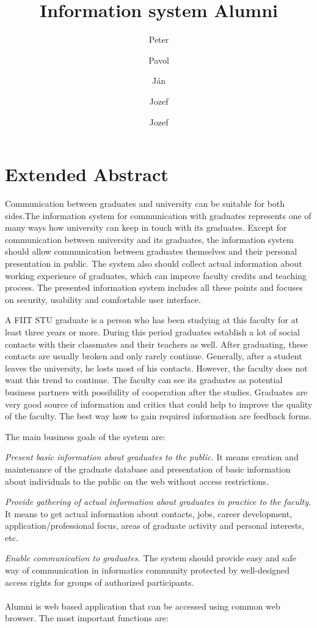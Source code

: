 \documentclass{iitsrc}
\title{Information system Alumni}
\author{Peter}{C\'ich}
\author{Pavol}{F\'abik}
\author{J\'an}{Garaj}
\author{Jozef}{Hergott}
\author{Jozef}{Hopko}
\begin{document}
\section*{Extended Abstract}

Communication between graduates and university can be suitable for both sides.The information system for communication with graduates represents one of many ways how university can keep in touch with its graduates. Except for communication between university and its graduates, the information system should allow communication between graduates themselves and their personal presentation in public. The system also should collect actual information about working experience of graduates, which can improve faculty credits and teaching process. The presented information system includes all these points and focuses on security, usability and comfortable user interface.


A FIIT STU graduate is a person who has been studying at this faculty for at least three years or more. During this period graduates establish a lot of social contacts with their classmates and their teachers as well. After graduating, these contacts are usually broken and only rarely continue. Generally, after a student leaves the university, he losts most of his contacts. However, the faculty does not want this trend to continue. The faculty can see its graduates as potential business partners with possibility of cooperation after the studies. Graduates are very good source of information and critics that could help to improve the quality of the faculty. The best way how to gain required information are feedback forms.

The main business goals of the system are:

{\em Present basic information about graduates to the public.}
It means creation and maintenance of the graduate database and presentation of basic information about individuals to the public on the web without access restrictions.

{\em Provide gathering of actual information about graduates in practice to the faculty.} 
It means to get actual information about contacts, jobs, career development, application/professional focus, areas of graduate activity and personal interests, etc.

{\em Enable communication to graduates.}
The system should provide easy and safe way of communication in informatics community protected by well-designed access rights for groups of authorized participants.
\\
\\
Alumni is web based application that can be accessed using common web browser. The most important functions are:
\end{document}
